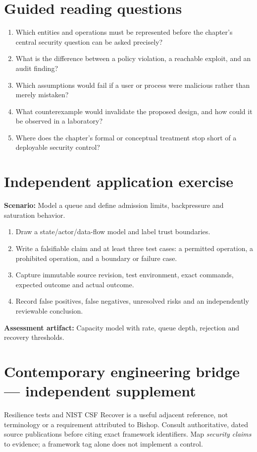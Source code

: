 \documentclass[10pt,letterpaper]{article}
\begin{document}
\section{Guided reading questions}
\begin{enumerate}
\item Which entities and operations must be represented before the chapter's central security question can be asked precisely?
\item What is the difference between a policy violation, a reachable exploit, and an audit finding?
\item Which assumptions would fail if a user or process were malicious rather than merely mistaken?
\item What counterexample would invalidate the proposed design, and how could it be observed in a laboratory?
\item Where does the chapter's formal or conceptual treatment stop short of a deployable security control?
\end{enumerate}
\section{Independent application exercise}
\textbf{Scenario:} Model a queue and define admission limits, backpressure and saturation behavior.
\begin{enumerate}
\item Draw a state/actor/data-flow model and label trust boundaries.
\item Write a falsifiable claim and at least three test cases: a permitted operation, a prohibited operation, and a boundary or failure case.
\item Capture immutable source revision, test environment, exact commands, expected outcome and actual outcome.
\item Record false positives, false negatives, unresolved risks and an independently reviewable conclusion.
\end{enumerate}
\textbf{Assessment artifact:} Capacity model with rate, queue depth, rejection and recovery thresholds.
\section{Contemporary engineering bridge --- independent supplement}
Resilience tests and NIST CSF Recover is a useful adjacent reference, not terminology or a requirement attributed to Bishop. Consult authoritative, dated source publications before citing exact framework identifiers. Map \emph{security claims} to evidence; a framework tag alone does not implement a control.
\end{document}
